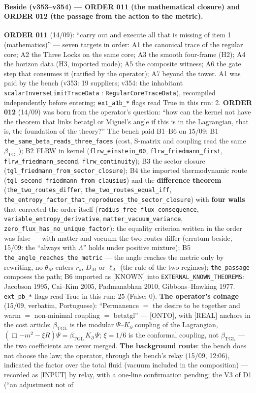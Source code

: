 \documentclass[11pt]{article}
\newcommand{\bTGL}{\beta_{\mathrm{TGL}}}\newcommand{\Msun}{M_{\odot}}\newcommand{\TGL}{\mathrm{TGL}}
\theoremstyle{definition}\newtheorem{deriv}{Derivation}
\begin{document}
\paragraph*{Beside (v353--v354) --- ORDER 011 (the mathematical closure) and ORDER 012 (the passage from the action to the metric).} \textbf{ORDER 011} (14/09): ``carry out and execute all that is missing of item 1 (mathematics)'' --- seven targets in order: A1 the canonical trace of the regular core; A2 the Three Locks on the same core; A3 the smooth four-frame (H2); A4 the horizon data (H3, imported mode); A5 the composite witness; A6 the gate step that consumes it (ratified by the operator); A7 beyond the tower. A1 was paid by the bench (v353: 19 suppliers; v354: the inhabitant \texttt{scalarInverseLimitTraceData} : \texttt{RegularCoreTraceData}), recompiled independently before entering; \texttt{ext\_a1b\_*} flags read True in this run: 2. \textbf{ORDER 012} (14/09) was born from the operator's question: ``how can the kernel not have the theorem that links betatgl or Miguel's angle if this is in the Lagrangian, that is, the foundation of the theory?'' The bench paid B1--B6 on 15/09: B1 \texttt{the\_same\_beta\_reads\_three\_faces} (cost, S-matrix and coupling read the same $\bTGL$); B2 FLRW in kernel (\texttt{flrw\_einstein\_00}, \texttt{flrw\_friedmann\_first}, \texttt{flrw\_friedmann\_second}, \texttt{flrw\_continuity}); B3 the sector closure (\texttt{tgl\_friedmann\_from\_sector\_closure}); B4 the imported thermodynamic route (\texttt{tgl\_second\_friedmann\_from\_clausius}) and the \textbf{difference theorem} (\texttt{the\_two\_routes\_differ}, \texttt{the\_two\_routes\_equal\_iff}, \texttt{the\_entropy\_factor\_that\_reproduces\_the\_sector\_closure}) with \textbf{four walls} that corrected the order itself (\texttt{radius\_free\_flux\_consequence}, \texttt{variable\_entropy\_derivative}, \texttt{matter\_vacuum\_variance}, \texttt{zero\_flux\_has\_no\_unique\_factor}): the equality criterion written in the order was false --- with matter and vacuum the two routes differ (erratum beside, 15/09: the ``always with $\Lambda$'' holds under positive mixture); B5 \texttt{the\_angle\_reaches\_the\_metric} --- the angle reaches the metric only by rewriting, no $\theta_M$ enters $r_s$, $D_M$ or $\ell_A$ (the rule of the two regimes); \texttt{the\_passage} composes the path; B6 imported as [KNOWN] into \texttt{EXTERNAL\_KNOWN\_THEOREMS}: Jacobson 1995, Cai--Kim 2005, Padmanabhan 2010, Gibbons--Hawking 1977. \texttt{ext\_pb\_*} flags read True in this run: 25 (False: 0). \textbf{The operator's coinage} (15/09, verbatim, Portuguese): ``Permanence $=$ the desire to be together and warm $=$ non-minimal coupling $=$ betatgl'' --- [ONTO], with [REAL] anchors in the cost article: $\bTGL$ is the modular $\Psi$--$K_\partial$ coupling of the Lagrangian, $(\Box - m^2 - \xi R)\Psi = \bTGL\,K_\partial\,\Psi$; $\xi=1/6$ is the conformal coupling, not $\bTGL$ --- the two coefficients are never merged. \textbf{The background route}: the bench does not choose the law; the operator, through the bench's relay (15/09, 12:06), indicated the factor over the total fluid (vacuum included in the composition) --- recorded as [INPUT] by relay, with a one-line confirmation pending; the V3 of D1 (``an adjustment not of 
\end{document}
